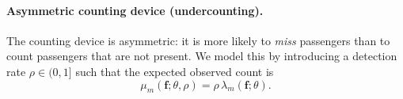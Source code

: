 \paragraph{Asymmetric counting device (undercounting).}
The counting device is asymmetric: it is more likely to \emph{miss} passengers than to count passengers that are not present.
We model this by introducing a detection rate $\rho\in(0,1]$ such that the expected observed count is
\[
\mu_m(\bm f;\theta,\rho) = \rho\,\lambda_m(\bm f;\theta).
\]

